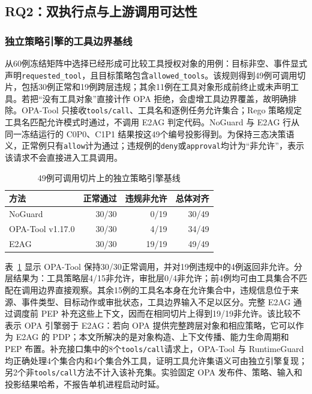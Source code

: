\subsection{RQ2：双执行点与上游调用可达性}

\subsubsection{独立策略引擎的工具边界基线}

从60例冻结矩阵中选择已经形成可比较工具授权对象的用例：目标非空、事件显式声明\texttt{requested\_tool}，且目标策略包含\texttt{allowed\_tools}。该规则得到49例可调用切片，包括30例正常和19例跨层违规；其余11例在工具对象形成前终止或未声明工具。若把“没有工具对象”直接计作 OPA 拒绝，会虚增工具边界覆盖，故明确排除。OPA-Tool 只接收\texttt{tools/call}、工具名和逐例任务允许集合；Rego 策略规定工具名匹配允许模式时通过，不调用 E2AG 判定代码。NoGuard 与 E2AG 行从同一冻结运行的 C0P0、C1P1 结果按这49个编号投影得到。为保持三态决策语义，正常例只有\texttt{allow}计为通过；违规例的\texttt{deny}或\texttt{approval}均计为“非允许”，表示该请求不会直接进入工具调用。

\begin{table}[htbp]
\centering
\caption{49例可调用切片上的独立策略引擎基线}
\label{tab:rq2-opa-v11}
\small
\begin{tabular}{lrrr}
\toprule
方法 & 正常通过 & 违规非允许 & 总体对齐 \\
\midrule
NoGuard & 30/30 & 0/19 & 30/49 \\
OPA-Tool v1.17.0 & 30/30 & 4/19 & 34/49 \\
E2AG & 30/30 & 19/19 & 49/49 \\
\bottomrule
\end{tabular}
\end{table}

表~\ref{tab:rq2-opa-v11} 显示 OPA-Tool 保持30/30正常调用，并对19例违规中的4例返回非允许。分层结果为：工具策略层4/15非允许，审批层0/4非允许；前4例均可由工具集合不匹配在调用边界直接观察。其余15例的工具名本身在允许集合中，违规信息位于来源、事件类型、目标动作或审批状态，工具边界输入不足以区分。完整 E2AG 通过调度前 PEP 补充这些上下文，因而在相同切片上得到19/19非允许。该比较不表示 OPA 引擎弱于 E2AG：若向 OPA 提供完整跨层对象和相应策略，它可以作为 E2AG 的 PDP；本文所解决的是对象构造、上下文传播、能力生命周期和 PEP 布置。补充接口集中的8个\texttt{tools/call}请求上，OPA-Tool 与 RuntimeGuard 均正确处理4个集合内和4个集合外工具，证明工具允许集语义可由独立引擎复现；另2个非\texttt{tools/call}方法不计入该补充集。实验固定 OPA 发布件、策略、输入和投影结果哈希，不报告单机进程启动时延。

